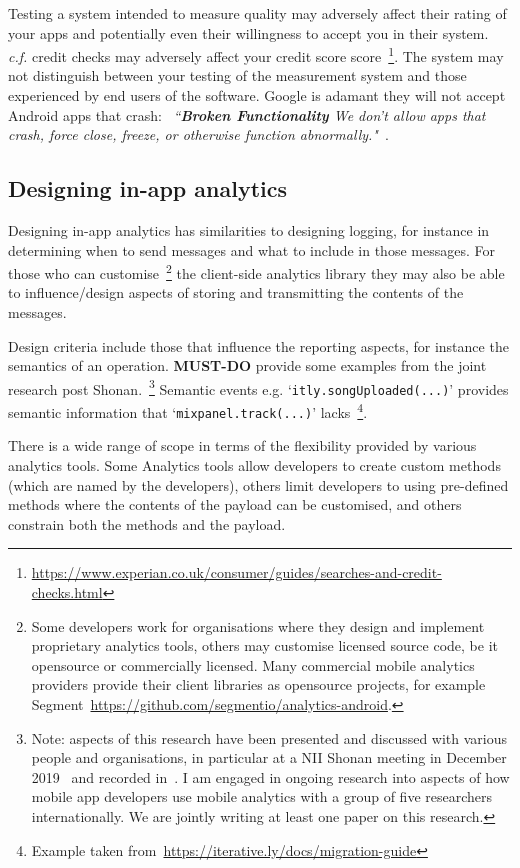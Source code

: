 Testing a system intended to measure quality may adversely affect their rating of your apps and potentially even their willingness to accept you in their system. \emph{c.f.} credit checks may adversely affect your credit score score~\footnote{\url{https://www.experian.co.uk/consumer/guides/searches-and-credit-checks.html}}. The system may not distinguish between your testing of the measurement system and those experienced by end users of the software. Google is adamant they will not accept Android apps that crash: ~\emph{``\textbf{Broken Functionality} We don’t allow apps that crash, force close, freeze, or otherwise function abnormally."}~\cite{google_play_developer_policy_center}.


\subsection{Designing in-app analytics}
Designing in-app analytics has similarities to designing logging, for instance in determining when to send messages and what to include in those messages. For those who can customise~\footnote{Some developers work for organisations where they design and implement proprietary analytics tools, others may customise licensed source code, be it opensource or commercially licensed. Many commercial mobile analytics providers provide their client libraries as opensource projects, for example Segment~\url{https://github.com/segmentio/analytics-android}.} the client-side analytics library they may also be able to influence/design aspects of storing and transmitting the contents of the messages.

Design criteria include those that influence the reporting aspects, for instance the semantics of an operation. \textbf{MUST-DO} provide some examples from the joint research post Shonan.~\footnote{Note: aspects of this research have been presented and discussed with various people and organisations, in particular at a NII Shonan meeting in December 2019~\cite{nii_shonan_workshop_152} and recorded in~\cite{nii_shonan_152_workshop_report}. I am engaged in ongoing research into aspects of how mobile app developers use mobile analytics with a group of five researchers internationally. We are jointly writing at least one paper on this research.}
%
Semantic events e.g. `\texttt{itly.songUploaded(...)}' provides semantic information that `\texttt{mixpanel.track(...)}' lacks~\footnote{Example taken from~\url{https://iterative.ly/docs/migration-guide}}.

There is a wide range of scope in terms of the flexibility provided by various analytics tools. Some Analytics tools allow developers to create custom methods (which are named by the developers), others limit developers to using pre-defined methods where the contents of the payload can be customised, and others constrain both the methods and the payload.

